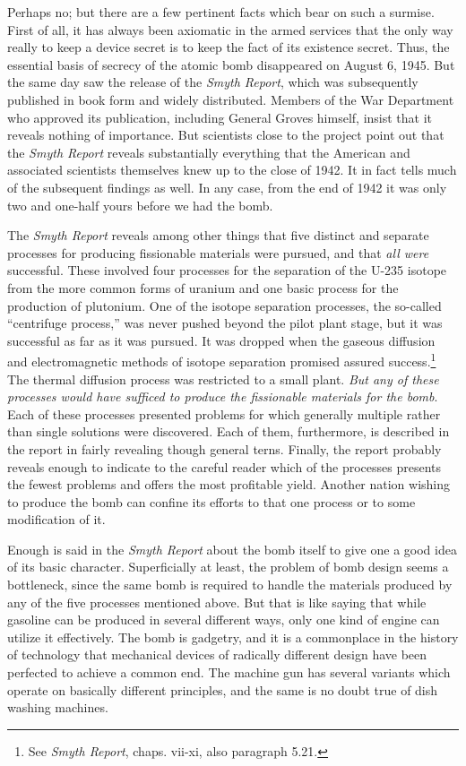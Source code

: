 Perhaps no; but there are a few pertinent facts which bear on such a surmise. First of all, it has always been axiomatic in the armed services that the only way really to keep a device secret is to keep the fact of its existence secret. Thus, the essential basis of secrecy of the atomic bomb disappeared on August 6, 1945. But the same day saw the release of the \emph{Smyth Report}, which was subsequently published in book form and widely distributed. Members of the War Department who approved its publication, including General Groves himself, insist that it reveals nothing of importance. But scientists close to the project point out that the \emph{Smyth Report} reveals substantially everything that the American and associated scientists themselves knew up to the close of 1942. It in fact tells much of the subsequent findings as well. In any case, from the end of 1942 it was only two and one-half yours before we had the bomb.

The \emph{Smyth Report} reveals among other things that five distinct and separate processes for producing fissionable materials were pursued, and that \emph{all were} successful. These involved four processes for the separation of the U-235 isotope from the more common forms of uranium and one basic process for the production of plutonium. One of the isotope separation processes, the so-called ``centrifuge process,'' was never pushed beyond the pilot plant stage, but it was successful as far as it was pursued. It was dropped when the gaseous diffusion and electromagnetic methods of isotope separation promised assured success.\footnote{See \emph{Smyth Report}, chaps. vii-xi, also paragraph 5.21.} The thermal diffusion process was restricted to a small plant. \emph{But any of these processes would have sufficed to produce the fissionable materials for the bomb}. Each of these processes presented problems for which generally multiple rather than single solutions were discovered. Each of them, furthermore, is described in the report in fairly revealing though general terns. Finally, the report probably reveals enough to indicate to the careful reader which of the processes presents the fewest problems and offers the most profitable yield. Another nation wishing to produce the bomb can confine its efforts to that one process or to some modification of it.

Enough is said in the \emph{Smyth Report} about the bomb itself to give one a good idea of its basic character. Superficially at least, the problem of bomb design seems a bottleneck, since the same bomb is required to handle the materials produced by any of the five processes mentioned above. But that is like saying that while gasoline can be produced in several different ways, only one kind of engine can utilize it effectively. The bomb is gadgetry, and it is a commonplace in the history of technology that mechanical devices of radically different design have been perfected to achieve a common end. The machine gun has several variants which operate on basically different principles, and the same is no doubt true of dish washing machines.


